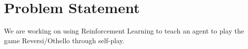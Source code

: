 \documentclass[../proposal.tex]{subfiles}
\begin{document}
\section{Problem Statement}
\label{problem_statement}
We are working on using Reinforcement Learning to teach an agent to play the game Reversi/Othello through self-play.
\end{document}
